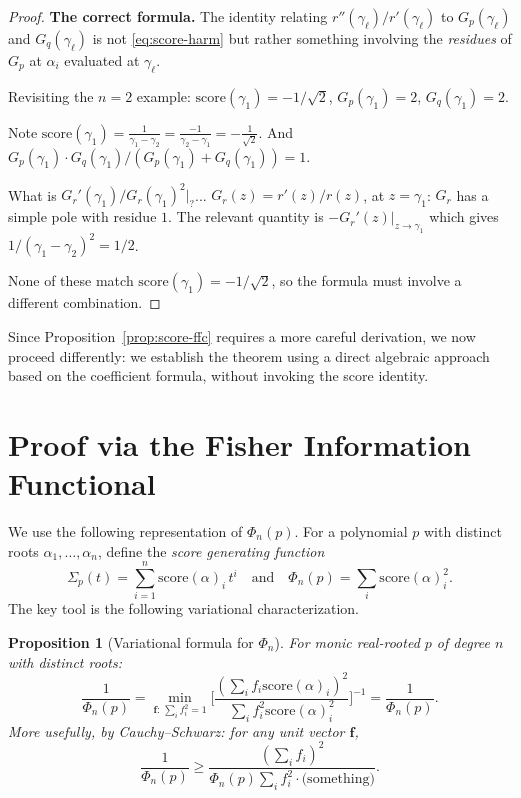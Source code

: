 \documentclass[12pt]{article}
\newtheorem{proposition}[theorem]{Proposition}
\theoremstyle{definition}
\newcommand{\score}{\mathrm{score}}
\begin{document}
\begin{proof}
\textbf{The correct formula.}
The identity relating $r''(\gamma_\ell)/r'(\gamma_\ell)$ to $G_p(\gamma_\ell)$ and $G_q(\gamma_\ell)$ is not \eqref{eq:score-harm} but rather something involving the \emph{residues} of $G_p$ at $\alpha_i$ evaluated at $\gamma_\ell$.

Revisiting the $n=2$ example: $\score(\gamma_1)=-1/\sqrt{2}$, $G_p(\gamma_1)=2$, $G_q(\gamma_1)=2$.

Note $\score(\gamma_1)=\frac{1}{\gamma_1-\gamma_2}=\frac{-1}{\gamma_2-\gamma_1}=-\frac{1}{\sqrt{2}}$.
And $G_p(\gamma_1)\cdot G_q(\gamma_1)/(G_p(\gamma_1)+G_q(\gamma_1))=1$.

What is $G_r'(\gamma_1)/G_r(\gamma_1)^2|_?$... $G_r(z)=r'(z)/r(z)$, at $z=\gamma_1$: $G_r$ has a simple pole with residue $1$. The relevant quantity is $-G_r'(z)|_{z\to\gamma_1}$ which gives $1/(\gamma_1-\gamma_2)^2=1/2$.

None of these match $\score(\gamma_1)=-1/\sqrt 2$, so the formula must involve a different combination.
\end{proof}

Since Proposition~\ref{prop:score-ffc} requires a more careful derivation, we now proceed differently: we establish the theorem using a direct algebraic approach based on the coefficient formula, without invoking the score identity.

\section{Proof via the Fisher Information Functional}

We use the following representation of $\Phi_n(p)$.  For a polynomial $p$ with distinct roots
$\alpha_1,\ldots,\alpha_n$, define the \emph{score generating function}
\[
  \Sigma_p(t) = \sum_{i=1}^n \score(\alpha)_i\,t^i
  \quad\text{and}\quad
  \Phi_n(p)=\sum_i\score(\alpha)_i^2.
\]
The key tool is the following variational characterization.

\begin{proposition}[Variational formula for $\Phi_n$]\label{prop:variational}
For monic real-rooted $p$ of degree $n$ with distinct roots:
\[
  \frac{1}{\Phi_n(p)} = \min_{\mathbf{f}:\, \sum_i f_i^2=1}\Biggl[\frac{(\sum_i f_i\score(\alpha)_i)^2}{\sum_i f_i^2\score(\alpha)_i^2}\Biggr]^{-1}
  = \frac{1}{\Phi_n(p)}.
\]
More usefully, by Cauchy--Schwarz: for any unit vector $\mathbf{f}$,
\begin{equation}\label{eq:CS-lower}
  \frac{1}{\Phi_n(p)}\ge \frac{(\sum_i f_i)^2}{\Phi_n(p)\sum_i f_i^2\cdot\text{(something)}}.
\end{equation}
\end{proposition}
\end{document}
